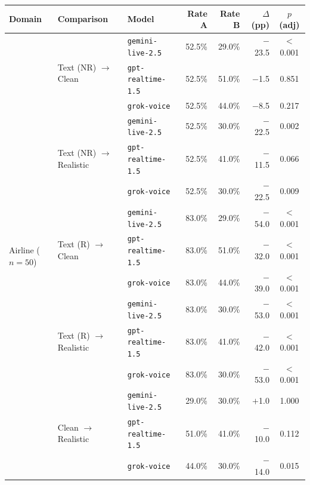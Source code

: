 \begin{tabular}{lllrrrc}
\toprule
{\color{red!75!black}\textbf{Domain}} & \textbf{Comparison} & {\color{red!75!black}\textbf{Model}} & \textbf{Rate A} & \textbf{Rate B} & \textbf{$\Delta$ (pp)} & \textbf{$p$ (adj)} \\
\midrule
\multirow{15}{*}{\color{red!75!black}Airline ($n=50$)}
 & \multirow{3}{*}{Text (NR) $\to$ Clean} & {\color{red!75!black}\texttt{gemini-live-2.5}} & 52.5\% & 29.0\% & $-$23.5 & $<$0.001 \\
 &  & {\color{red!75!black}\texttt{gpt-realtime-1.5}} & 52.5\% & 51.0\% & $-$1.5 & 0.851 \\
 &  & {\color{red!75!black}\texttt{grok-voice}} & 52.5\% & 44.0\% & $-$8.5 & 0.217 \\
\cmidrule(l){2-7}
 & \multirow{3}{*}{Text (NR) $\to$ Realistic} & {\color{red!75!black}\texttt{gemini-live-2.5}} & 52.5\% & 30.0\% & $-$22.5 & 0.002 \\
 &  & {\color{red!75!black}\texttt{gpt-realtime-1.5}} & 52.5\% & 41.0\% & $-$11.5 & 0.066 \\
 &  & {\color{red!75!black}\texttt{grok-voice}} & 52.5\% & 30.0\% & $-$22.5 & 0.009 \\
\cmidrule(l){2-7}
 & \multirow{3}{*}{Text (R) $\to$ Clean} & {\color{red!75!black}\texttt{gemini-live-2.5}} & 83.0\% & 29.0\% & $-$54.0 & $<$0.001 \\
 &  & {\color{red!75!black}\texttt{gpt-realtime-1.5}} & 83.0\% & 51.0\% & $-$32.0 & $<$0.001 \\
 &  & {\color{red!75!black}\texttt{grok-voice}} & 83.0\% & 44.0\% & $-$39.0 & $<$0.001 \\
\cmidrule(l){2-7}
 & \multirow{3}{*}{Text (R) $\to$ Realistic} & {\color{red!75!black}\texttt{gemini-live-2.5}} & 83.0\% & 30.0\% & $-$53.0 & $<$0.001 \\
 &  & {\color{red!75!black}\texttt{gpt-realtime-1.5}} & 83.0\% & 41.0\% & $-$42.0 & $<$0.001 \\
 &  & {\color{red!75!black}\texttt{grok-voice}} & 83.0\% & 30.0\% & $-$53.0 & $<$0.001 \\
\cmidrule(l){2-7}
 & \multirow{3}{*}{Clean $\to$ Realistic} & {\color{red!75!black}\texttt{gemini-live-2.5}} & 29.0\% & 30.0\% & $+$1.0 & 1.000 \\
 &  & {\color{red!75!black}\texttt{gpt-realtime-1.5}} & 51.0\% & 41.0\% & $-$10.0 & 0.112 \\
 &  & {\color{red!75!black}\texttt{grok-voice}} & 44.0\% & 30.0\% & $-$14.0 & 0.015 \\

\end{tabular}
